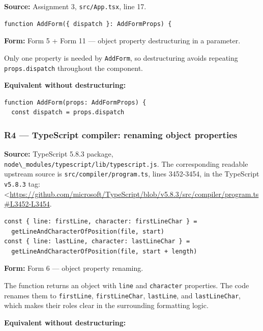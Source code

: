 \documentclass[
]{article}
\newcommand{\passthrough}[1]{#1}
\begin{document}
\textbf{Source:} Assignment 3, \passthrough{\lstinline!src/App.tsx!},
line 17.

\begin{lstlisting}
function AddForm({ dispatch }: AddFormProps) {
\end{lstlisting}

\textbf{Form:} Form 5 + Form 11 --- object property destructuring in a
parameter.

Only one property is needed by \passthrough{\lstinline!AddForm!}, so
destructuring avoids repeating \passthrough{\lstinline!props.dispatch!}
throughout the component.

\textbf{Equivalent without destructuring:}

\begin{lstlisting}
function AddForm(props: AddFormProps) {
  const dispatch = props.dispatch
\end{lstlisting}

\subsubsection{R4 --- TypeScript compiler: renaming object
properties}\label{r4--typescript-compiler-renaming-object-properties}

\textbf{Source:} TypeScript 5.8.3 package,
\passthrough{\lstinline!node\_modules/typescript/lib/typescript.js!}.
The corresponding readable upstream source is
\passthrough{\lstinline!src/compiler/program.ts!}, lines 3452-3454, in
the TypeScript \passthrough{\lstinline!v5.8.3!} tag:
\textless{}\url{https://github.com/microsoft/TypeScript/blob/v5.8.3/src/compiler/program.ts\#L3452-L3454}.

\begin{lstlisting}
const { line: firstLine, character: firstLineChar } =
  getLineAndCharacterOfPosition(file, start)
const { line: lastLine, character: lastLineChar } =
  getLineAndCharacterOfPosition(file, start + length)
\end{lstlisting}

\textbf{Form:} Form 6 --- object property renaming.

The function returns an object with \passthrough{\lstinline!line!} and
\passthrough{\lstinline!character!} properties. The code renames them to
\passthrough{\lstinline!firstLine!},
\passthrough{\lstinline!firstLineChar!},
\passthrough{\lstinline!lastLine!}, and
\passthrough{\lstinline!lastLineChar!}, which makes their roles clear in
the surrounding formatting logic.

\textbf{Equivalent without destructuring:}
\end{document}
